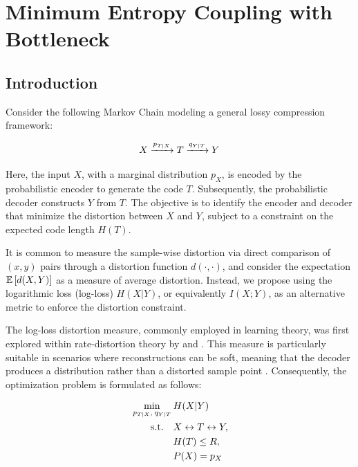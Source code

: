 \chapter{Minimum Entropy Coupling with Bottleneck}\label{ch:mecb}

\section{Introduction}\label{ch3:sec:introduction}

Consider the following Markov Chain modeling a general lossy compression framework:

\begin{equation}
    X \xrightarrow{p_{T|X}} T \xrightarrow{q_{Y|T}} Y
\end{equation}

Here, the input $X$, with a marginal distribution $p_X$, is encoded by the probabilistic encoder \enc to generate the code $T$. Subsequently, the probabilistic decoder \dec constructs $Y$ from $T$. The objective is to identify the encoder and decoder that minimize the distortion between $X$ and $Y$, subject to a constraint on the expected code length $H(T)$.

It is common to measure the sample-wise distortion via direct comparison of $(x, y)$ pairs through a distortion function $d(\cdot, \cdot)$, and consider the expectation $\mathbb{E} \left[ d(X,Y)  \right]$ as a measure of average distortion. Instead, we propose using the logarithmic loss (log-loss) $H(X|Y)$, or equivalently $I(X;Y)$, as an alternative metric to enforce the distortion constraint.

The log-loss distortion measure, commonly employed in learning theory, was first explored within rate-distortion theory by \cite{courtade2011multiterminal} and \cite{courtade2013multiterminal}. This measure is particularly suitable in scenarios where reconstructions can be soft, meaning that the decoder produces a distribution rather than a distorted sample point \cite{shkel2017single}. Consequently, the optimization problem is formulated as follows:

\begin{equation}
\begin{aligned} \label{ch3:eq:no_const}
    &\min_{p_{T|X},\; q_{Y|T}} \hspace{-1em} &&H(X|Y) \\
    &\hspace{2em} \textrm{s.t.} &&X \leftrightarrow T \leftrightarrow Y, \\
    & &&H(T) \leq R, \\
    & &&P(X) = p_X
\end{aligned}
\end{equation}

